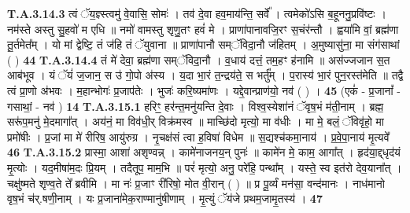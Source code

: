 \documentclass[17pt]{extarticle}
\begin{document}
                  \newline
                                                                  \textbf{ T.A.3.14.3} \newline
                  त्वं ॅय॒ज्ञ्स्त्वमु॑ वे॒वासि॒ सोमः॑ । तव॑ दे॒वा हव॒माय॑न्ति॒ सर्वे᳚ । त्वमेको॑ऽसि ब॒हूननु॒प्रवि॑ष्टः । नम॑स्ते अस्तु सु॒हवो॑ म एधि ॥  नमो॑ वामस्तु शृणु॒तꣳ हवं॑ मे । प्राणा॑पानावजि॒रꣳ स॒चंर॑न्तौ ।  ह्वया॑मि वां॒ ब्रह्म॑णा तू॒र्तमेत᳚म् । यो मां द्वेष्टि॒ तं ज॑हि तं ॅयुवाना ॥  प्राणा॑पानौ सम्ॅविदा॒नौ ज॑हितम् ।  अ॒मुष्यासु॑ना॒ मा संग॑साथां ( ) \textbf{ 44} \newline
                  \newline
                                                                  \textbf{ T.A.3.14.4} \newline
                  तं मे॑ देवा॒ ब्रह्म॑णा सम्ॅविदा॒नौ ।  व॒धाय॑ दत्तं॒ तम॒हꣳ ह॑नामि ॥ अस॑ज्जजान स॒त आब॑भूव । यं ॅयं॑ ज॒जान॒ स उ॑ गो॒पो अ॑स्य ।  य॒दा भा॒रं त॒न्द्रय॑ते॒ स भर्तु᳚म् । प॒रास्य॑ भा॒रं पुन॒रस्त॑मेति ॥  तद्वै त्वं प्रा॒णो अ॑भवः । म॒हान्भोगः॑ प्र॒जाप॑तेः । भुजः॑ करि॒ष्यमा॑णः । यद्दे॒वान्प्राण॑यो॒ नव॑ ( ) । \textbf{ 45} \newline
                  \newline
                                                        (एकं॑ - प्र॒जानां᳚ - गसाथां॒ - नव॑ ) \textbf{14} \newline \newline
                                \textbf{ T.A.3.15.1} \newline
                  हरिꣳ॒॒ हर॑न्त॒मनु॑यन्ति दे॒वाः । विश्व॒स्येशा॑नं ॅवृष॒भं म॑ती॒नाम् । ब्रह्म॒ सरू॑प॒मनु॑ मे॒दमागा᳚त् । अय॑नं॒ मा विव॑धी॒र् विक्र॑मस्व ॥  माच्छि॑दो मृत्यो॒ मा व॑धीः । मा मे॒ बलं॒ ॅविवृ॑हो॒ मा प्रमो॑षीः । प्र॒जां मा मे॑ रीरिष॒ आयु॑रुग्र । नृ॒चक्ष॑सं त्वा ह॒विषा॑ विधेम ॥  स॒द्यश्च॑कमा॒नाय॑ । प्र॒वे॒पा॒नाय॑ मृ॒त्यवे᳚ \textbf{ 46} \newline
                  \newline
                                                                  \textbf{ T.A.3.15.2} \newline
                  प्रास्मा॒ आशा॑ अशृण्वन्न् । कामे॑नाजनय॒न् पुनः॑ ॥  कामे॑न मे॒ काम॒ आगा᳚त् । हृद॑या॒द्द्धृद॑यं मृ॒त्योः । यद॒मीषा॑म॒दः प्रि॒यम् । तदैतूप॒ माम॒भि ॥ परं॑ मृत्यो॒ अनु॒ परे॑हि॒ पन्था᳚म् । यस्ते॒ स्व इत॑रो देव॒याना᳚त् । चक्षु॑ष्मते शृण्व॒ते ते᳚ ब्रवीमि । मा नः॑ प्र॒जाꣳ री॑रिषो॒ मोत वी॒रान् ( ) ॥  प्र पू॒र्व्यं मन॑सा॒ वन्द॑मानः । नाध॑मानो वृष॒भं च॑र्.षणी॒नाम् । यः प्र॒जाना॑मेक॒राण्मानु॑षीणाम् ।  मृ॒त्युं ॅय॑जे प्रथम॒जामृ॒तस्य॑ । \textbf{ 47} \newline
\end{document}
